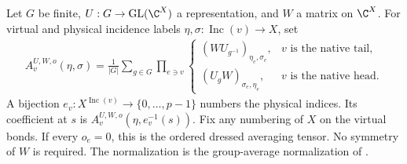 \begin{definition}%
    \label{def:peps_oriented_averaging_tensor}
    \leanok
    Let $G$ be finite, $U:G\to\mathrm{GL}(\C^X)$ a representation,
    and $W$ a matrix on $\C^X$. For virtual and physical incidence labels
    $\eta,\sigma:\operatorname{Inc}(v)\to X$, set
    \begin{align}
        A^{U,W,o}_v(\eta,\sigma)
        =\frac1{|G|}\sum_{g\in G}
        \prod_{e\ni v}
        \begin{cases}
            (WU_{g^{-1}})_{\eta_e,\sigma_e}, & v\text{ is the native tail}, \\
            (U_gW)_{\sigma_e,\eta_e},        & v\text{ is the native head}.
        \end{cases}
        \label{eq:peps_oriented_site}
    \end{align}
    A bijection $e_v:X^{\operatorname{Inc}(v)}\to\{0,\ldots,p-1\}$
    numbers the physical indices. Its coefficient at $s$ is
    $A^{U,W,o}_v(\eta,e_v^{-1}(s))$. Fix any numbering of $X$ on the
    virtual bonds. If every $o_e=0$, this is the ordered
    dressed averaging tensor. No symmetry of $W$ is required.
    The normalization is the group-average normalization of
    \cite{gap:rmp_peps_quantum_double_g_isometry}.
\end{definition}

